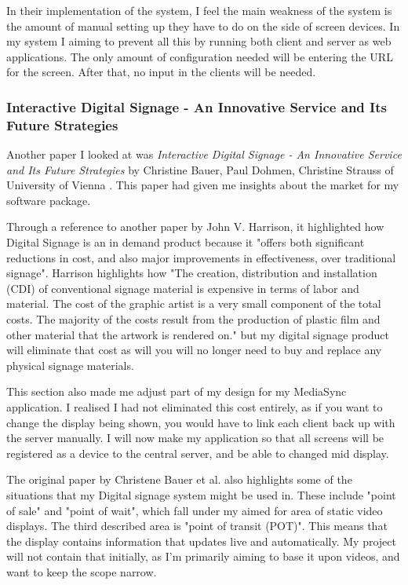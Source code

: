 \documentclass{article}
\begin{document}
In their implementation of the system, I feel the main weakness of the system is the amount of manual setting up they have to do on the side of screen devices. In my system I aiming to prevent all this by running both client and server as web applications. The only amount of configuration needed will be entering the URL for the screen. After that, no input in the clients will be needed.

\subsubsection{Interactive Digital Signage - An Innovative Service and Its Future Strategies}
Another paper I looked at was \textit{Interactive Digital Signage - An Innovative Service and Its Future Strategies} by Christine Bauer, Paul Dohmen, Christine Strauss of University of Vienna \cite{future}. This paper had given me insights about the market for my software package.

Through a reference to another paper by John V. Harrison, it highlighted how Digital Signage is an in demand product because it "offers both significant reductions in cost, and also major improvements in effectiveness, over traditional signage". Harrison highlights how "The creation, distribution and installation (CDI) of conventional signage material is expensive in terms of labor and material. The cost of the graphic artist is a very small component of the total costs. The majority of the costs result from the production of plastic film and other material that the artwork is rendered on." \cite{HARRISON2004163} but my digital signage product will eliminate that cost as will you will no longer need to buy and replace any physical signage materials. 

This section also made me adjust part of my design for my MediaSync application. I realised I had not eliminated this cost entirely, as if you want to change the display being shown, you would have to link each client back up with the server manually. I will now make my application so that all screens will be registered as a device to the central server, and be able to changed mid display. 

The original paper by Christene Bauer et al. also highlights some of the situations that my Digital signage system might be used in. These include "point of sale" and "point of wait", which fall under my aimed for area of static video displays. The third described area is "point of transit (POT)". This means that the display contains information that updates live and automatically. My project will not contain that initially, as I'm primarily aiming to base it upon videos, and want to keep the scope narrow.
\end{document}
